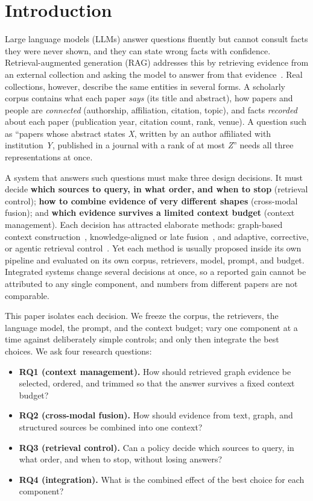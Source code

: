 \documentclass[conference]{IEEEtran}
\begin{document}
\section{Introduction}\label{sec:intro}

Large language models (LLMs) answer questions fluently but cannot consult facts they were never shown, and they can state wrong facts with confidence. Retrieval-augmented generation (RAG) addresses this by retrieving evidence from an external collection and asking the model to answer from that evidence~\cite{lewis2020,gao2023}. Real collections, however, describe the same entities in several forms. A scholarly corpus contains what each paper \emph{says} (its title and abstract), how papers and people are \emph{connected} (authorship, affiliation, citation, topic), and facts \emph{recorded} about each paper (publication year, citation count, rank, venue). A question such as ``papers whose abstract states \emph{X}, written by an author affiliated with institution \emph{Y}, published in a journal with a rank of at most \emph{Z}'' needs all three representations at once.

A system that answers such questions must make three design decisions. It must decide \textbf{which sources to query, in what order, and when to stop} (retrieval control); \textbf{how to combine evidence of very different shapes} (cross-modal fusion); and \textbf{which evidence survives a limited context budget} (context management). Each decision has attracted elaborate methods: graph-based context construction~\cite{he2024gretriever,zhu2025kg2rag,zhou2026qafd}, knowledge-aligned or late fusion~\cite{liang2024kag,wu2026sag,hsiao2025megarag}, and adaptive, corrective, or agentic retrieval control~\cite{jeong2024adaptive,yan2024crag,agentg2025}. Yet each method is usually proposed inside its own pipeline and evaluated on its own corpus, retrievers, model, prompt, and budget. Integrated systems change several decisions at once, so a reported gain cannot be attributed to any single component, and numbers from different papers are not comparable.

This paper isolates each decision. We freeze the corpus, the retrievers, the language model, the prompt, and the context budget; vary one component at a time against deliberately simple controls; and only then integrate the best choices. We ask four research questions:

\begin{itemize}
\item \textbf{RQ1 (context management).} How should retrieved graph evidence be selected, ordered, and trimmed so that the answer survives a fixed context budget?
\item \textbf{RQ2 (cross-modal fusion).} How should evidence from text, graph, and structured sources be combined into one context?
\item \textbf{RQ3 (retrieval control).} Can a policy decide which sources to query, in what order, and when to stop, without losing answers?
\item \textbf{RQ4 (integration).} What is the combined effect of the best choice for each component?
\end{itemize}
\end{document}

